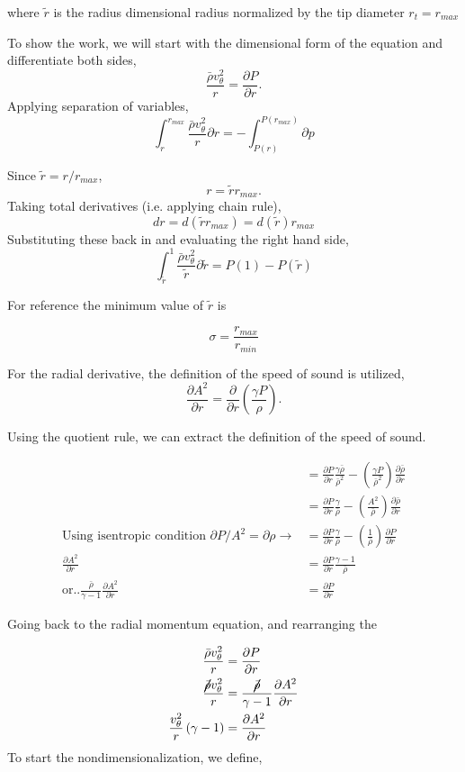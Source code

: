where $\tilde{r}$ is the radius dimensional radius normalized 
by the tip diameter $r_t = r_{max}$

To show the work, we will start with the dimensional form of the equation and
differentiate both sides,
\[
    \frac{\bar{\rho} v_{\theta}^2}{r} 
    =\frac{\partial P}{\partial r}.
\]
Applying separation of variables,
\[
    \int_{r}^{r_{max}}
    \frac{\bar{\rho} v_{\theta}^2}{r} \partial r 
    =-\int_{P(r)}^{P(r_{max})}\partial p
\]

Since $\tilde{r} = r/r_{max}$,
\[r = \tilde{r}r_{max}.\]
Taking total derivatives (i.e. applying chain rule),
\[dr = d(\tilde{r}r_{max}) = d(\tilde{r})r_{max}\]
Substituting these back in and evaluating the right hand side,
\[
    \int_{\tilde{r}}^{1} \frac{\bar{\rho} v_{\theta}^2}{\tilde{r}}\partial \tilde{r} 
    =P(1)-P(\tilde{r})
\]

For reference the minimum value of $\tilde{r}$ is

\[\sigma = \frac{r_{max}}{r_{min}}\]

For the radial derivative, the definition of the speed of sound is utilized,
\[\frac{\partial A^2}{\partial r } =
\frac{\partial}{\partial r} \left( \frac{\gamma P}{\rho} \right).\]

Using the quotient rule, we can extract the definition of the speed of sound.

\begin{align*}
&= \frac{\partial P}{\partial r} \frac{\gamma \bar{\rho}}{\bar{\rho}^2} -
\left(
    \frac{\gamma P}{\bar{\rho}^2} 
\right) 
\frac{\partial \bar{\rho}}{\partial r}\\
&=  \frac{\partial P}{\partial r} \frac{\gamma }{\bar{\rho}} -
\left( \frac{A^2}{\bar{\rho}} \right) 
\frac{\partial \bar{\rho} }{\partial r}\\
\text{Using isentropic condition } \partial P/A^2 =
\partial \rho \rightarrow 
&= \frac{\partial P}{\partial r} \frac{\gamma }{\bar{\rho}} -
\left( \frac{1}{\bar{\rho}} \right) \frac{\partial  P }{\partial r}\\
\frac{\partial A^2}{\partial r} 
&= \frac{\partial P}{\partial r} \frac{\gamma - 1}{\bar{\rho}}  \\ \text{or..}
    \frac{\bar{\rho}}{\gamma -1}\frac{\partial A^2}{\partial r} &= \frac{\partial P}{\partial r} 
\end{align*}


Going back to the radial momentum equation, and rearranging the 

\begin{align*}
    \frac{\bar{\rho} v_{\theta}^2}{r} 
&=\frac{\partial P}{\partial r}\\
\frac{\cancel{
        \bar{\rho}
} v_{\theta}^2}{r} 
&=\frac{\cancel{\bar{\rho}}}{\gamma -1}\frac{\partial A^2}{\partial r}\\
    \frac{v_{\theta}^2}{r}\left(\gamma -1\right) &= \frac{\partial A^2}{\partial r}
\end{align*}
To start the nondimensionalization, we define,

